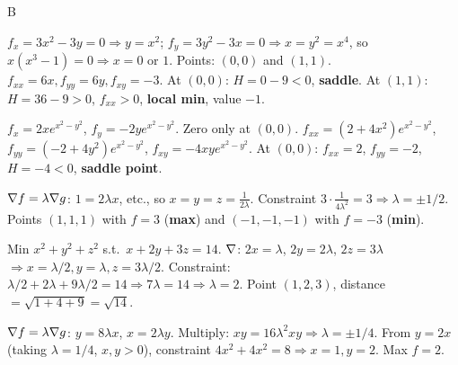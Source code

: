 \documentclass[11pt]{article}
\begin{document}
\begin{answers}{B}
\item $f_x = 3x^2 - 3y = 0 \Rightarrow y = x^2$; $f_y = 3y^2 - 3x = 0 \Rightarrow x = y^2 = x^4$, so $x(x^3 - 1) = 0 \Rightarrow x = 0$ or $1$. Points: $(0,0)$ and $(1,1)$. $f_{xx} = 6x, f_{yy} = 6y, f_{xy} = -3$. At $(0,0)$: $H = 0 - 9 < 0$, \textbf{saddle}. At $(1,1)$: $H = 36 - 9 > 0$, $f_{xx} > 0$, \textbf{local min}, value $-1$.
\item $f_x = 2x e^{x^2 - y^2}$, $f_y = -2y e^{x^2-y^2}$. Zero only at $(0,0)$. $f_{xx} = (2 + 4x^2) e^{x^2-y^2}$, $f_{yy} = (-2 + 4y^2)e^{x^2-y^2}$, $f_{xy} = -4xy e^{x^2-y^2}$. At $(0,0)$: $f_{xx} = 2$, $f_{yy} = -2$, $H = -4 < 0$, \textbf{saddle point}.
\item $\nabla f = \lambda \nabla g$: $1 = 2\lambda x$, etc., so $x = y = z = \tfrac{1}{2\lambda}$. Constraint $3 \cdot \tfrac{1}{4\lambda^2} = 3 \Rightarrow \lambda = \pm 1/2$. Points $(1,1,1)$ with $f = 3$ (\textbf{max}) and $(-1,-1,-1)$ with $f = -3$ (\textbf{min}).
\item Min $x^2 + y^2 + z^2$ s.t.\ $x + 2y + 3z = 14$. $\nabla$: $2x = \lambda$, $2y = 2\lambda$, $2z = 3\lambda$ $\Rightarrow x = \lambda/2, y = \lambda, z = 3\lambda/2$. Constraint: $\lambda/2 + 2\lambda + 9\lambda/2 = 14 \Rightarrow 7\lambda = 14 \Rightarrow \lambda = 2$. Point $(1,2,3)$, distance $= \sqrt{1+4+9} = \boxed{\sqrt{14}}$.
\item $\nabla f = \lambda \nabla g$: $y = 8\lambda x$, $x = 2\lambda y$. Multiply: $xy = 16\lambda^2 xy \Rightarrow \lambda = \pm 1/4$. From $y = 2x$ (taking $\lambda = 1/4$, $x,y > 0$), constraint $4x^2 + 4x^2 = 8 \Rightarrow x = 1, y = 2$. Max $f = \boxed{2}$.
\end{answers}
\end{document}
